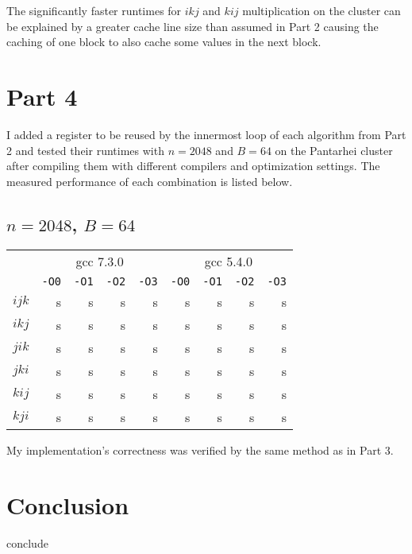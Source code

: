 \documentclass[12pt,letterpaper,oneside]{article}
\begin{document}
The significantly faster runtimes for $ikj$ and $kij$ multiplication on the cluster can be explained by a greater cache line size than assumed in Part 2 causing the caching of one block to also cache some values in the next block.

\section*{Part 4}
I added a register to be reused by the innermost loop of each algorithm from Part 2 and tested their runtimes with $n=2048$ and $B=64$ on the Pantarhei cluster after compiling them with different compilers and optimization settings. The measured performance of each combination is listed below.
\begin{center}
	\subsection*{$n=2048$, $B=64$}
	\begin{tabular}{c | r r r r | r r r r}
		& \multicolumn{4}{c|}{gcc 7.3.0} & \multicolumn{4}{c}{gcc 5.4.0} \\
		& \texttt{-O0} & \texttt{-O1} & \texttt{-O2} & \texttt{-O3} & \texttt{-O0} & \texttt{-O1} & \texttt{-O2} & \texttt{-O3} \\
		\hline
		$ijk$ &  s &  s &  s &  s &  s &  s &  s &  s \\
		$ikj$ &  s &  s &  s &  s &  s &  s &  s &  s \\
		$jik$ &  s &  s &  s &  s &  s &  s &  s &  s \\ 
		$jki$ &  s &  s &  s &  s &  s &  s &  s &  s \\
		$kij$ &  s &  s &  s &  s &  s &  s &  s &  s \\
		$kji$ &  s &  s &  s &  s &  s &  s &  s &  s
	\end{tabular}
\end{center}

My implementation's correctness was verified by the same method as in Part 3.

\section*{Conclusion}
conclude
 
\end{document}
